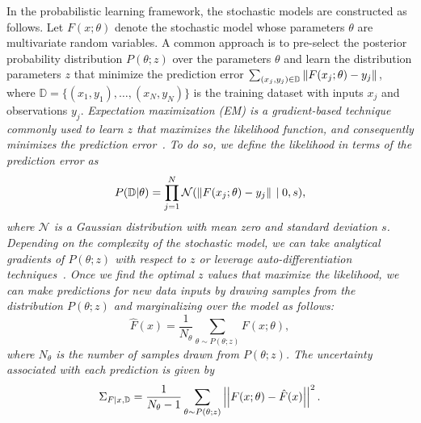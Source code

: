 In the probabilistic learning framework, the stochastic models are constructed
as follows.
%
Let $F(x; \theta)$ denote the stochastic model whose parameters $\theta$ are
multivariate random variables.
%
A common approach is to pre-select the posterior probability distribution
$P(\theta;z)$ over the parameters $\theta$ and learn the distribution parameters
$z$ that minimize the prediction error $\sum_{(x_j, y_j) \in \mathbb{D}}
\|{F(x_j; \theta) - y_j}\|_{{}_{}}$, where $\mathbb{D} = \{(x_1, y_1), \dots, (x_N,
y_N) \}$ is the training dataset with inputs $x_j$ and observations $y_j$.
%
\it{Expectation maximization} \normalfont (EM) is a gradient-based technique
commonly used to learn $z$ that maximizes the likelihood function, and
consequently minimizes the prediction error~\cite{bishop2006pattern}.
%
To do so, we define the likelihood in terms of the prediction error as
\begin{equation*}
  P(\mathbb{D} | \theta)  = \prod_{j=1}^{N} \mathcal{N}(\|{F(x_j; \theta) -  y_j}\|_{{}_{}} \; | \; 0, s),
\end{equation*}
\noindent where $\mathcal{N}$ is a Gaussian distribution with mean zero and
standard deviation $s$. 
%
Depending on the complexity of the stochastic model, we can take analytical
gradients of $P(\theta;z)$ with respect to $z$ or leverage
auto-differentiation techniques~\cite{revels2016forward}. 
%
Once we find the optimal $z$ values that maximize the likelihood, we can make
predictions for new data inputs by drawing samples from the distribution
$P(\theta;z)$ and marginalizing over the model as follows:
\begin{equation*}
  \hat{F}(x) = \frac{1}{N_{\theta}} \sum_{\theta \sim P(\theta;z)} F(x; \theta),
\end{equation*} 
\noindent where $N_{\theta}$ is the number of samples drawn from $P(\theta;z)$.
The uncertainty associated with each prediction is given by~\cite{jospin2020hands}
\begin{equation}
  \Sigma_{F \mid x,\mathbb{D}} = \frac{1}{N_{\theta}-1} \sum_{\theta \sim P(\theta;z)} \left|\left|F(x; \theta) - \hat{F}(x)\right|\right|^2.
  \label{eqn:predictive_variance}
\end{equation}
%

